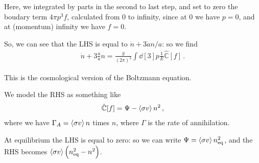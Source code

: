 \documentclass[main.tex]{subfiles}
\begin{document}
Here, we integrated by parts in the second to last step, and set to zero the boudary term \(4 \pi p^3 f\), calculated from 0 to infinity, since at \(0\) we have \(p=0\), and at (momentum) infinity we have \(f=0\).

So, we can see that the LHS is equal to \(\dot{n} + 3 \dot{a}n/a \): so we find 
%
\begin{align}
  \dot{n} + 3 \frac{\dot{a}}{a} n = \frac{g}{(2 \pi )^3} \int \dd[3]{p} \frac{1}{E} \hat{\mathbb{C}} [f]
\,.
\end{align}

This is the cosmological version of the Boltzmann equation. 

We model the RHS as something like 
%
\begin{align}
  \hat{\mathbb{C}}[f] = \Psi - \expval{\sigma v } n^2
\,,
\end{align}
%
where we have \(\Gamma_A = \expval{\sigma v} n\) times \(n\), where \(\Gamma \) is the rate of annihilation. 

At equilibrium the LHS is 
equal to zero: so we can write \(\Psi = \expval{\sigma v} n^2 _{\text{eq}}\), and the RHS becomes \(\expval{\sigma v} \qty(n^2 _{\text{eq}} - n^2)\).
\end{document}
